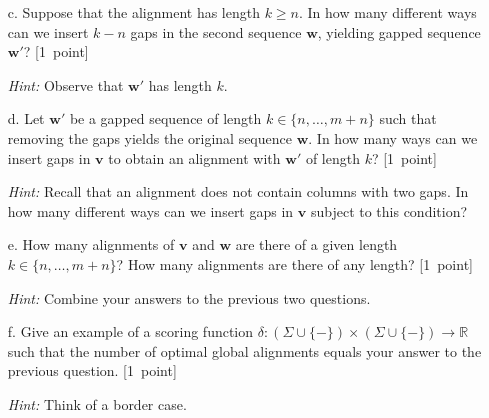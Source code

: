 \begin{enumerate}
\begin{itemize}
{{}}


\item[c.] Suppose that the alignment has length $k \ge n$. In how many different ways can we insert $k - n$ gaps in the second sequence $\mathbf{w}$, yielding gapped sequence $\mathbf{w}'$? [1~point]

\emph{Hint:} Observe that $\mathbf{w}'$ has length $k$.


\item[d.] Let $\mathbf{w}'$ be a gapped sequence of length $k \in \{n,\ldots,m+n\}$ such that removing the gaps yields the original sequence $\mathbf{w}$. 
In how many ways can we insert gaps in $\mathbf{v}$ to obtain an alignment with $\mathbf{w}'$ of length $k$?  [1~point]

\emph{Hint:} Recall that an alignment does not contain columns with two gaps. In how many different ways can we insert gaps in $\mathbf{v}$ subject to this condition?


\item[e.] How many alignments of $\mathbf{v}$ and $\mathbf{w}$ are there of a given length $k \in \{n, \ldots, m+n\}$? How many alignments are there of any length? [1~point]

\emph{Hint:} Combine your answers to the previous two questions.



\item[f.] Give an example of a scoring function $\delta : (\Sigma \cup \{-\}) \times (\Sigma \cup \{-\}) \rightarrow \mathbb{R}$ such that the number of optimal global alignments equals your answer to the previous question. [1~point]

\emph{Hint:} Think of a border case.


\end{itemize}
\end{enumerate}


